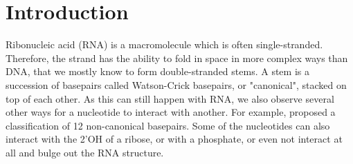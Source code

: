 \documentclass{bioinfo}
\begin{document}
\section{Introduction}
Ribonucleic acid (RNA) is a macromolecule which is often single-stranded. Therefore, the strand has the ability to fold in space in more complex ways than DNA, that we mostly know to form double-stranded stems. A stem is a succession of basepairs called Watson-Crick basepairs, or "canonical", stacked on top of each other. As this can still happen with RNA, we also observe several other ways for a nucleotide to interact with another. For example, \citealp{leontis2001geometric} proposed a classification of 12 non-canonical basepairs. Some of the nucleotides can also interact with the 2'OH of a ribose, or with a phosphate, or even not interact at all and bulge out the RNA structure.
   
\end{document}
